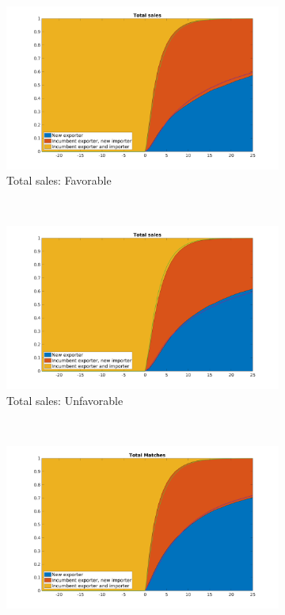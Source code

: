 \documentclass[12pt]{article}
\begin{document}
\begin{figure}[tbp]
\centering
\begin{subfigure}[b]{0.45\textwidth}
        \centering
        \includegraphics[width=\textwidth]{figures/total_sales_pct}
        \caption{Total sales: Favorable}
    \end{subfigure} ~ 
\begin{subfigure}[b]{0.45\textwidth}
        \centering
        \includegraphics[width=\textwidth]{figures/total_sales_pct_unf}
        \caption{Total sales: Unfavorable}
    \end{subfigure} \newline
~ 
\begin{subfigure}[b]{0.45\textwidth}
        \centering
        \includegraphics[width=\textwidth]{figures/total_matches_pct}

\end{subfigure}
\end{figure}
\end{document}
